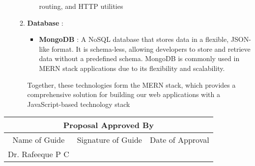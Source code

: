 \documentclass[14pt]{article}
\begin{document}
\begin{enumerate}
\begin{enumerate}
\begin{itemize}
routing, and HTTP utilities
\end{itemize}
\item \textbf{Database} :
\begin{itemize}
\item \textbf{MongoDB} : A NoSQL database that stores data in a flexible, JSON-like format.
It is schema-less, allowing developers to store and retrieve data without a predefined schema. MongoDB is commonly used in MERN stack applications due to its flexibility and scalability.
\end{itemize}
\tabto{.5cm} Together, these technologies form the MERN stack, which provides a comprehensive solution for building our web applications with a JavaScript-based
technology stack
\end{enumerate}

\end{enumerate}
\begin{table}[ht!]
\begin{center}
\begin{tabular}{|cll|}
\hline
\multicolumn{3}{|c|}{\textbf{Proposal Approved By}}                                                                   \\ \hline
\multicolumn{1}{|c|}{Name of Guide} & \multicolumn{1}{c|}{Signature of Guide} & \multicolumn{1}{c|}{Date of Approval} \\ \hline
\multicolumn{1}{|l|}{Dr. Rafeeque P C}              & \multicolumn{1}{l|}{}                   &                                       \\ \hline
\end{tabular}
\end{center}
\end{table}
\end{document}
